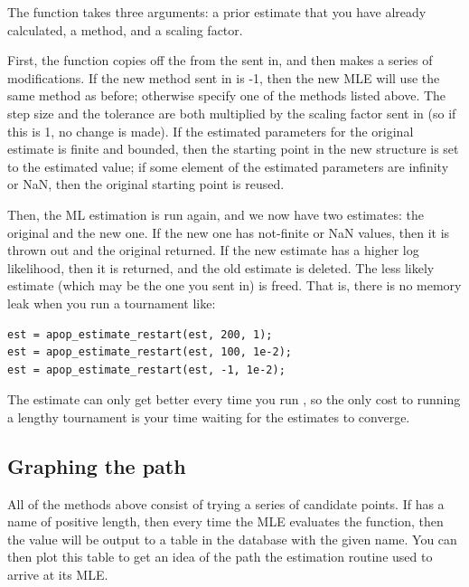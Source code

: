 The function takes three arguments: a prior estimate that you have
already calculated, a method, and a scaling factor. 

First, the function copies off the 
from the  sent in, and then makes a series of
modifications.  If the new method sent in is -1, then the new MLE will
use the same method as before; otherwise specify one of the methods
listed above. The step size and the tolerance are both multiplied by the
scaling factor sent in (so if this is 1, no change is made). If the
estimated parameters for the original estimate is finite and bounded, then 
the starting point in the new 
structure is set to the estimated value; if some element of the
estimated parameters are infinity or NaN, then the original starting
point is reused.

Then, the ML estimation is run again, and we now have two estimates: the
original and the new one. If the new one has not-finite or NaN values,
then it is thrown out and the original returned. If the new estimate 
has a higher log likelihood, then it is returned, and the old estimate
is deleted.  The less likely estimate (which may be the one you sent in) is freed. That is,
there is no memory leak when you run a tournament like:
\begin{lstlisting}
est = apop_estimate_restart(est, 200, 1);
est = apop_estimate_restart(est, 100, 1e-2);
est = apop_estimate_restart(est, -1, 1e-2);
\end{lstlisting}
The estimate can only get better every time you run
, so the only cost to running a lengthy
tournament is your time waiting for the estimates to converge.

\subsection{Graphing the path} All of the methods above consist of
trying a series of candidate points. 
If 
has a name of positive
length, then every time the MLE evaluates the function, then the value
will be output to a table in the database with the given name. You can
then plot this table to get an idea of the path the estimation routine
used to arrive at its MLE.

